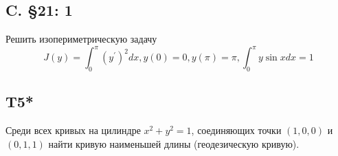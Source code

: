 \documentclass{article}
\begin{document}
\subsection{C. \S21: 1}
Решить изопериметрическую задачу
\begin{equation}
J(y)=\int_{0}^{\pi}\left(y^{\prime}\right)^{2} d x, y(0)=0, y(\pi)=\pi, \int_{0}^{\pi} y \sin x d x=1
\end{equation}
\subsection{T5*}
Среди всех кривых на цилиндре $x^{2}+y^{2}=1$, соединяющих точки $(1,0,0)$ и $(0,1,1)$ найти кривую наименьшей длины (геодезическую кривую).
\end{document}

